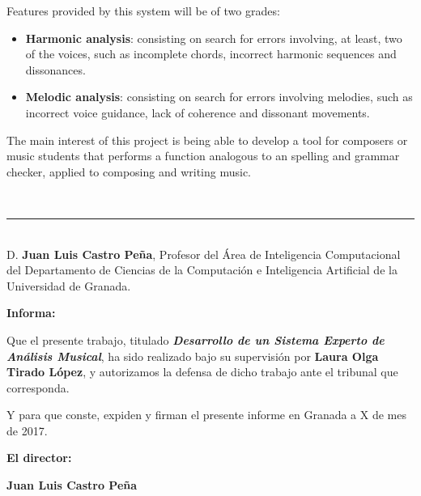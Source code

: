 \documentclass[a4paper, 12pt]{report}
\numberwithin{equation}{section} %
\numberwithin{figure}{section} %
\numberwithin{table}{section} %
\begin{document}
\bigskip

Features provided by this system will be of two grades:

\begin{itemize}
	\item \textbf{Harmonic analysis}: consisting on search for errors involving, at least, two of the voices, such as incomplete chords, incorrect harmonic sequences and dissonances.
	\item  \textbf{Melodic analysis}: consisting on search for errors involving melodies, such as incorrect voice guidance, lack of coherence and dissonant movements. 
\end{itemize}

\bigskip

The main interest of this project is being able to develop a tool for composers or music students that performs a function analogous to an spelling and grammar checker, applied to composing and writing music. 

\newpage
\thispagestyle{empty}
\

\noindent\rule[-1ex]{\textwidth}{2pt}\\[4.5ex]

D. \textbf{Juan Luis Castro Peña}, Profesor del Área de Inteligencia Computacional del Departamento de Ciencias de la Computación e Inteligencia Artificial de la Universidad de Granada.

\vspace{0.5cm}

\textbf{Informa:}

\vspace{0.5cm}

Que el presente trabajo, titulado \textit{\textbf{Desarrollo de un Sistema Experto de Análisis Musical}},
ha sido realizado bajo su supervisión por \textbf{Laura Olga Tirado López}, y autorizamos la defensa de dicho trabajo ante el tribunal que corresponda.

\vspace{0.5cm}

Y para que conste, expiden y firman el presente informe en Granada a X de mes de 2017.

\vspace{1cm}

\textbf{El director:}

\vspace{5cm}

\noindent \textbf{Juan Luis Castro Peña}

\newpage
\thispagestyle{empty}
\
\end{document}
